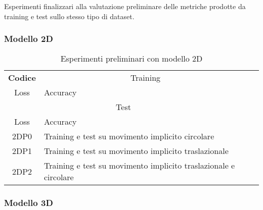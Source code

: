 Esperimenti finalizzari alla valutazione preliminare delle metriche prodotte da training e test sullo stesso tipo di dataset.

\subsubsection{Modello 2D}

\begin{table}[H]
	\begin{tabularx}{\textwidth}{|c|X|c|c|}
		\hline 
		\textbf{Codice} &
		\multicolumn{2}{c}{Training} \\ Loss & Accuracy & \\
		\multicolumn{2}{c}{Test} \\ Loss & Accuracy \\
		\hline
		2DP0 &
		Training e test su movimento implicito circolare \\ 
		\hline
		2DP1 &
		Training e test su movimento implicito traslazionale \\ 
		\hline
		2DP2 & 
		Training e test su movimento implicito traslazionale e circolare \\ 
		\hline 
	\end{tabularx}
	\caption{Esperimenti preliminari con modello 2D}
	\label{esperimenti-preliminari-2D}
\end{table}

\newpage

\subsubsection{Modello 3D}

